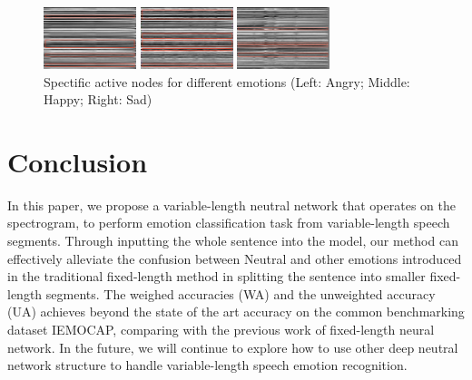 \documentclass[a4paper]{article}
\begin{document}
\begin{figure}[htb]
    \begin{minipage}[b]{0.27\linewidth}
      \centering
      \centerline{\includegraphics[width=2.7cm]{rnn_out_var_ang}}
    \end{minipage}
    \hfill
    \begin{minipage}[b]{0.27\linewidth}
      \centering
      \centerline{\includegraphics[width=2.7cm]{rnn_out_var_hap}}
    \end{minipage}
    \hfill
    \begin{minipage}[b]{0.27\linewidth}
      \centering
      \centerline{\includegraphics[width=2.7cm]{rnn_out_var_sad}}
    \end{minipage}
    \caption{Spectific active nodes for different emotions (Left: Angry; Middle: Happy; Right: Sad)}
    \label{fig:rnn_emo}
\end{figure}

    
\section{Conclusion}
\label{sec:conclusion}

In this paper, we propose a variable-length neutral network that operates on the spectrogram, to perform emotion classification task from variable-length speech segments. Through inputting the whole sentence into the model, our method can effectively alleviate the confusion between Neutral and other emotions introduced in the traditional fixed-length method in splitting the sentence into smaller fixed-length segments. The weighed accuracies (WA) and the unweighted accuracy (UA) achieves beyond the state of the art accuracy on the common benchmarking dataset IEMOCAP, comparing with the previous work of fixed-length neural network. In the future, we will continue to explore how to use other deep neutral network structure to handle variable-length speech emotion recognition.
\end{document}
